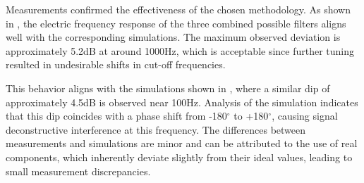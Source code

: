 Measurements confirmed the effectiveness of the chosen methodology. As shown in , the electric frequency response of the three combined possible filters aligns well with the corresponding simulations. The maximum observed deviation is approximately 5.2dB at around 1000Hz, which is acceptable since further tuning resulted in undesirable shifts in cut-off frequencies.

This behavior aligns with the simulations shown in , where a similar dip of approximately 4.5dB is observed near 100Hz. Analysis of the simulation indicates that this dip coincides with a phase shift from -180$^{\circ}$ to +180$^{\circ}$, causing signal deconstructive interference at this frequency. The differences between measurements and simulations are minor and can be attributed to the use of real components, which inherently deviate slightly from their ideal values, leading to small measurement discrepancies.

